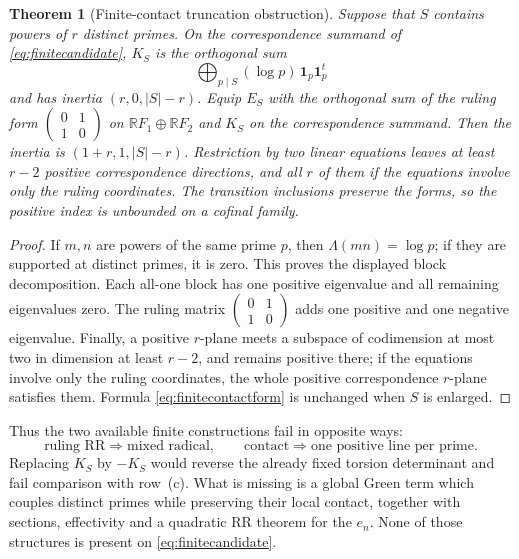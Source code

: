 \documentclass[11pt]{amsart}
\newtheorem{theorem}{Theorem}[section]
\theoremstyle{definition}
\theoremstyle{remark}
\begin{document}
\begin{theorem}[Finite-contact truncation obstruction]
\label{thm:finitecontactobstruction}
Suppose that $S$ contains powers of $r$ distinct primes.  On the
correspondence summand of \eqref{eq:finitecandidate}, $K_S$ is the orthogonal
sum
\[
 \bigoplus_{p\mid S}(\log p)\,\mathbf1_p\mathbf1_p^t
\]
and has inertia $(r,0,|S|-r)$.  Equip $E_S$ with the orthogonal sum of the
ruling form $\left(\begin{smallmatrix}0&1\\1&0\end{smallmatrix}\right)$ on
$\mathbb RF_1\oplus\mathbb RF_2$ and $K_S$ on the correspondence summand.
Then the inertia is $(1+r,1,|S|-r)$.  Restriction by two linear equations
leaves at least $r-2$ positive correspondence directions, and all $r$ of them
if the equations involve only the ruling coordinates.  The transition inclusions
preserve the forms, so the positive index is unbounded on a cofinal family.
\end{theorem}

\begin{proof}
If $m,n$ are powers of the same prime $p$, then
$\Lambda(mn)=\log p$; if they are supported at distinct primes, it is zero.
This proves the displayed block decomposition.  Each all-one block has one
positive eigenvalue and all remaining eigenvalues zero.  The ruling matrix
$\left(\begin{smallmatrix}0&1\\1&0\end{smallmatrix}\right)$ adds one positive
and one negative eigenvalue.  Finally, a positive $r$-plane meets a subspace
of codimension at most two in dimension at least $r-2$, and remains positive
there; if the equations involve only the ruling coordinates, the whole
positive correspondence $r$-plane satisfies them.  Formula \eqref{eq:finitecontactform} is unchanged when $S$ is enlarged.
\end{proof}

Thus the two available finite constructions fail in opposite ways:
\begin{equation}\label{eq:finitealternative}
 \text{ruling RR}\Longrightarrow\text{mixed radical},
 \qquad
 \text{contact}\Longrightarrow\text{one positive line per prime}.
\end{equation}
Replacing $K_S$ by $-K_S$ would reverse the already fixed torsion determinant
and fail comparison with row~(c).  What is missing is a global Green term
which couples distinct primes while preserving their local contact, together
with sections, effectivity and a quadratic RR theorem for the $e_n$.  None of
those structures is present on \eqref{eq:finitecandidate}.
\end{document}
